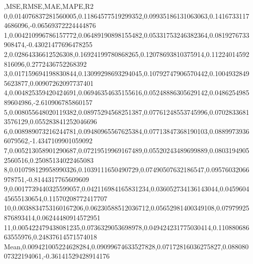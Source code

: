 ,MSE,RMSE,MAE,MAPE,R2
0,0.014076837281560005,0.11864577519299352,0.09935186131063063,0.14167331174686096,-0.06569372224444876
1,0.004210996786157772,0.06489190898155482,0.05331753246382364,0.0819276733908474,-0.43021477696478255
2,0.02864336612526308,0.16924199780868265,0.12078693810375914,0.11224014592816096,0.2772436752268392
3,0.017159694198830844,0.13099298693294045,0.10792747906570442,0.10049328495623877,0.00907262097737401
4,0.004825359420424691,0.06946354635155616,0.05248886305629142,0.048625498589604986,-2.610906785860157
5,0.008055648020119382,0.08975294568251387,0.07761248553745996,0.07028336813576129,0.055283841252046696
6,0.008989073216244781,0.09480965567625384,0.07713847368190103,0.08899739366079562,-1.4347109901059092
7,0.005213058901290687,0.07219519969167489,0.05520243489699889,0.08031949052560516,0.25085134022465083
8,0.010798129958990326,0.1039111650490729,0.07490507632186547,0.09576032066978751,-0.8144317765609609
9,0.0017739440325599057,0.042116984165831234,0.036052734136143044,0.045960445655130654,0.11570208772417707
10,0.0038834753160167206,0.06230588512036712,0.05652981400349108,0.07979925876893414,0.06244480914572951
11,0.005422479438081235,0.0736329053698978,0.049424231775030414,0.11088068663555976,0.24837614571574018
Mean,0.009421005224628284,0.09099674633527828,0.07172816036275827,0.08808007322194061,-0.36141529428914176
